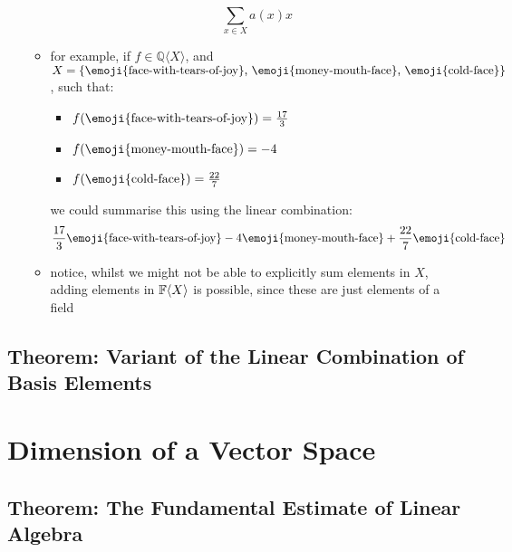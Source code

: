 \documentclass{exam}
\begin{document}
\begin{itemize}
\begin{itemize}
        \[
        \sum_{x \in X}a(x) x
        \]
        \item for example, if $f \in \mathbb{Q}\langle X \rangle$, and $X = \{\text{\emoji{face-with-tears-of-joy}, \emoji{money-mouth-face}, \emoji{cold-face}}\}$, such that:
        \begin{itemize}
            \item $f(\text{\emoji{face-with-tears-of-joy}}) = \frac{17}{3}$
            \item $f(\text{\emoji{money-mouth-face}}) = -4$
            \item $f(\text{\emoji{cold-face}}) = \frac{22}{7}$
        \end{itemize}
        we could summarise this using the linear combination:
        \[
        \frac{17}{3}\text{\emoji{face-with-tears-of-joy}} -4\text{\emoji{money-mouth-face}} + \frac{22}{7}\text{\emoji{cold-face}}
        \]
        \item notice, whilst we might not be able to explicitly sum elements in $X$, adding elements in $\mathbb{F}\langle X \rangle$ is possible, since these are just elements of a field
    \end{itemize}
\end{itemize}

\subsection{Theorem: Variant of the Linear Combination of Basis Elements}


\section{Dimension of a Vector Space}

\subsection{Theorem: The Fundamental Estimate of Linear Algebra}
\end{document}
